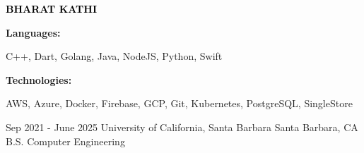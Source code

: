 \documentclass[9pt]{developercv} %
\begin{document}

\begin{minipage}[t]{0.5\textwidth} 
	\vspace{-\baselineskip} %
	
	{ \fontsize{16}{20} \textcolor{black}{\textbf{\MakeUppercase{Bharat Kathi}}}} %
	
	\vspace{6pt}
    \hspace{22pt}

    \hspace{12pt}
    
\end{minipage}
\hfill
\begin{minipage}[t]{0.5\textwidth}
    \vspace{-18pt}
    \vspace{-6pt}
    
    \begin{minipage}[t]{0.2\textwidth}
        \textbf{Languages:}
    \end{minipage}
    \hfill
    \begin{minipage}[t]{0.73\textwidth}
        C++, Dart, Golang, Java, NodeJS, Python, Swift
    \end{minipage}
    \vspace{4mm}
    
    \begin{minipage}[t]{0.2\textwidth}
        \textbf{Technologies:}
    \end{minipage}
    \hfill
    \begin{minipage}[t]{0.73\textwidth}
        AWS, Azure, Docker, Firebase, GCP, Git, Kubernetes, PostgreSQL, SingleStore
    \end{minipage}
    
\end{minipage}


\vspace{-4 pt}
\begin{entrylist}
    \entry
		{Sep 2021 - June 2025}
		{University of California, Santa Barbara}
		{Santa Barbara, CA}
		{B.S. Computer Engineering}
\end{entrylist}
\end{document}

